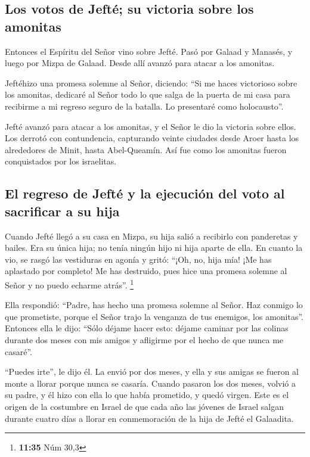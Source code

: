 \hypertarget{los-votos-de-jeftuxe9-su-victoria-sobre-los-amonitas}{%
\subsection{Los votos de Jefté; su victoria sobre los
amonitas}\label{los-votos-de-jeftuxe9-su-victoria-sobre-los-amonitas}}

 Entonces el Espíritu del Señor vino sobre Jefté. Pasó
por Galaad y Manasés, y luego por Mizpa de Galaad. Desde allí avanzó
para atacar a los amonitas.

 Jeftéhizo una promesa solemne al Señor, diciendo: ``Si
me haces victorioso sobre los amonitas,  dedicaré al
Señor todo lo que salga de la puerta de mi casa para recibirme a mi
regreso seguro de la batalla. Lo presentaré como holocausto''.

 Jefté avanzó para atacar a los amonitas, y el Señor le
dio la victoria sobre ellos.  Los derrotó con
contundencia, capturando veinte ciudades desde Aroer hasta los
alrededores de Minit, hasta Abel-Queamín. Así fue como los amonitas
fueron conquistados por los israelitas.

\hypertarget{el-regreso-de-jeftuxe9-y-la-ejecuciuxf3n-del-voto-al-sacrificar-a-su-hija}{%
\subsection{El regreso de Jefté y la ejecución del voto al sacrificar a
su
hija}\label{el-regreso-de-jeftuxe9-y-la-ejecuciuxf3n-del-voto-al-sacrificar-a-su-hija}}

 Cuando Jefté llegó a su casa en Mizpa, su hija salió a
recibirlo con panderetas y bailes. Era su única hija; no tenía ningún
hijo ni hija aparte de ella.  En cuanto la vio, se rasgó
las vestiduras en agonía y gritó: ``¡Oh, no, hija mía! ¡Me has aplastado
por completo! Me has destruido, pues hice una promesa solemne al Señor y
no puedo echarme atrás''. \footnote{\textbf{11:35} Núm 30,3}

 Ella respondió: ``Padre, has hecho una promesa solemne
al Señor. Haz conmigo lo que prometiste, porque el Señor trajo la
venganza de tus enemigos, los amonitas''.  Entonces ella
le dijo: ``Sólo déjame hacer esto: déjame caminar por las colinas
durante dos meses con mis amigos y afligirme por el hecho de que nunca
me casaré''.

 ``Puedes irte'', le dijo él. La envió por dos meses, y
ella y sus amigas se fueron al monte a llorar porque nunca se casaría.
 Cuando pasaron los dos meses, volvió a su padre, y él
hizo con ella lo que había prometido, y quedó virgen. Este es el origen
de la costumbre en Israel  de que cada año las jóvenes de
Israel salgan durante cuatro días a llorar en conmemoración de la hija
de Jefté el Galaadita.

